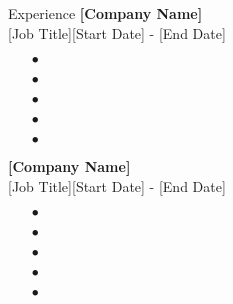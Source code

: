 \begin{rSection}{Experience}
{\bf [Company Name]} \\ 
{[Job Title]}\hfill {[Start Date] - [End Date]}
\begin{itemize}[label=\myfancylabel, leftmargin=0.5cm]
\setlength\itemsep{-0.25cm}
    \item[$\bullet$] 
    \item[$\bullet$] 
    \item[$\bullet$] 
    \item[$\bullet$] 
    \item[$\bullet$] 
\end{itemize}

{\bf [Company Name]} \\ 
{[Job Title]}\hfill {[Start Date] - [End Date]}
\begin{itemize}[label=\myfancylabel, leftmargin=0.5cm]
\setlength\itemsep{-0.25cm}
    \item[$\bullet$] 
    \item[$\bullet$] 
    \item[$\bullet$] 
    \item[$\bullet$] 
    \item[$\bullet$] 
\end{itemize}

\end{rSection}